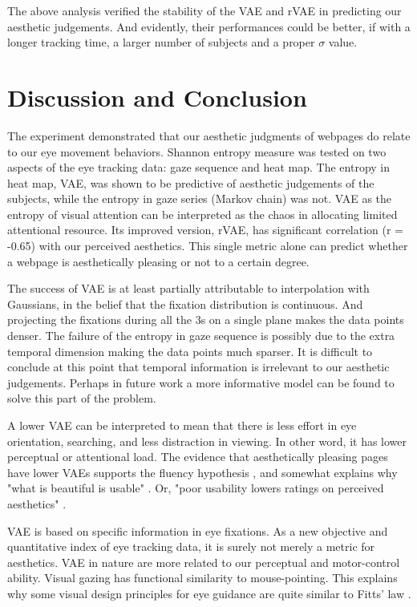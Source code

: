 The above analysis verified the stability of the VAE and rVAE in predicting our aesthetic judgements.
And evidently, their performances could be better, if with a longer tracking time, a larger number of subjects and a proper $\sigma$ value.

\section{Discussion and Conclusion}
\label{sec:dis}
The experiment demonstrated that our aesthetic judgments of webpages do relate to our eye movement behaviors. Shannon entropy measure was tested on two aspects of the eye tracking data: gaze sequence and heat map. The entropy in heat map, VAE, was shown to be predictive of aesthetic judgements of the subjects, while the entropy in gaze series (Markov chain) was not. VAE as the entropy of visual attention can be interpreted as the chaos in allocating limited attentional resource. Its improved version, rVAE, has significant correlation (r = -0.65) with our perceived aesthetics. This single metric alone can predict whether a webpage is aesthetically pleasing or not to a certain degree.

The success of VAE is at least partially attributable to interpolation with Gaussians, in the belief that the fixation distribution is continuous. And projecting the fixations during all the 3s on a single plane makes the data points denser. The failure of the entropy in gaze sequence is possibly due to the extra temporal dimension making the data points much sparser. It is difficult to conclude at this point that temporal information is irrelevant to our aesthetic judgements. Perhaps in future work a more informative model can be found to solve this part of the problem.

A lower VAE can be interpreted to mean that there is less effort in eye orientation, searching, and less distraction in viewing. In other word, it has lower perceptual or attentional load.
The evidence that aesthetically pleasing pages have lower VAEs supports the fluency hypothesis \citep{Reber2004}, and somewhat explains why "what is beautiful is usable" \citep{Tractinsky2000}. Or, "poor usability lowers ratings on perceived aesthetics" \citep{Tuch2012Is}.

VAE is based on specific information in eye fixations. As a new objective and quantitative index of eye tracking data, it is surely not merely a metric for aesthetics. VAE in nature are more related to our perceptual and motor-control ability. Visual gazing has functional similarity to mouse-pointing. This explains why some visual design principles for eye guidance are quite similar to Fitts' law \citep{MacKenzie1992}.


